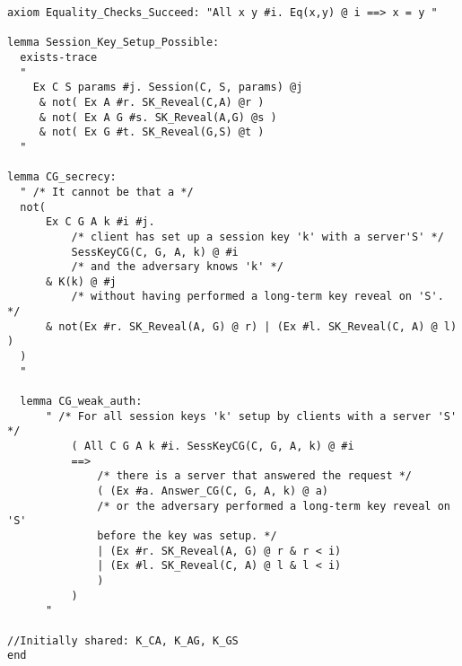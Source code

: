 \documentclass[a4paper, 12pt, titlepage]{article}
\begin{document}
\begin{lstlisting}[caption = Implementation of Kerberos v5 protocol \cite{github4}]
axiom Equality_Checks_Succeed: "All x y #i. Eq(x,y) @ i ==> x = y "

lemma Session_Key_Setup_Possible:
  exists-trace
  "
	Ex C S params #j. Session(C, S, params) @j
	 & not( Ex A #r. SK_Reveal(C,A) @r )
	 & not( Ex A G #s. SK_Reveal(A,G) @s )
	 & not( Ex G #t. SK_Reveal(G,S) @t )
  "

lemma CG_secrecy:
  " /* It cannot be that a */
  not(
	  Ex C G A k #i #j.
		  /* client has set up a session key 'k' with a server'S' */
		  SessKeyCG(C, G, A, k) @ #i
		  /* and the adversary knows 'k' */
	  & K(k) @ #j
		  /* without having performed a long-term key reveal on 'S'. */
	  & not(Ex #r. SK_Reveal(A, G) @ r) | (Ex #l. SK_Reveal(C, A) @ l) )
  )
  "
  
  lemma CG_weak_auth:
	  " /* For all session keys 'k' setup by clients with a server 'S' */
		  ( All C G A k #i. SessKeyCG(C, G, A, k) @ #i
		  ==>
			  /* there is a server that answered the request */
			  ( (Ex #a. Answer_CG(C, G, A, k) @ a)
			  /* or the adversary performed a long-term key reveal on 'S'
			  before the key was setup. */
			  | (Ex #r. SK_Reveal(A, G) @ r & r < i)
			  | (Ex #l. SK_Reveal(C, A) @ l & l < i)
			  )
		  )
	  "

//Initially shared: K_CA, K_AG, K_GS
end
\end{lstlisting}
\end{document}
